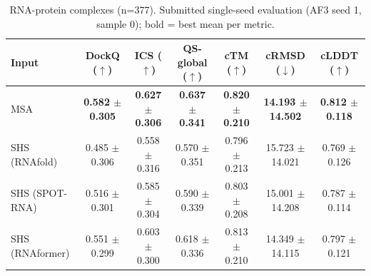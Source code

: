 \begin{table}[htbp]
\centering
\caption{RNA-protein complexes (n=377). Submitted single-seed evaluation (AF3 seed 1, sample 0); bold = best mean per metric.}
\label{tab:rna_protein_complexes}
\begin{tabular}{lcccccc}
\toprule
Input & DockQ ($\uparrow$) & ICS ($\uparrow$) & QS-global ($\uparrow$) & cTM ($\uparrow$) & cRMSD ($\downarrow$) & cLDDT ($\uparrow$) \\
\midrule
MSA & \textbf{0.582 $\pm$ 0.305} & \textbf{0.627 $\pm$ 0.306} & \textbf{0.637 $\pm$ 0.341} & \textbf{0.820 $\pm$ 0.210} & \textbf{14.193 $\pm$ 14.502} & \textbf{0.812 $\pm$ 0.118} \\
SHS (RNAfold) & 0.485 $\pm$ 0.306 & 0.558 $\pm$ 0.316 & 0.570 $\pm$ 0.351 & 0.796 $\pm$ 0.213 & 15.723 $\pm$ 14.021 & 0.769 $\pm$ 0.126 \\
SHS (SPOT-RNA) & 0.516 $\pm$ 0.301 & 0.585 $\pm$ 0.304 & 0.590 $\pm$ 0.339 & 0.803 $\pm$ 0.208 & 15.001 $\pm$ 14.208 & 0.787 $\pm$ 0.114 \\
SHS (RNAformer) & 0.551 $\pm$ 0.299 & 0.603 $\pm$ 0.300 & 0.618 $\pm$ 0.336 & 0.813 $\pm$ 0.210 & 14.349 $\pm$ 14.115 & 0.797 $\pm$ 0.121 \\
\bottomrule
\end{tabular}
\end{table}
